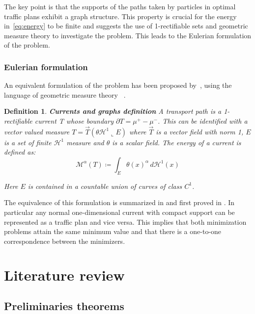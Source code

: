 \documentclass[12pt,a4paper]{article}
\numberwithin{equation}{section}
\theoremstyle{mytheorem}
\newtheorem{definition}[subsubsection]{Definition}
\theoremstyle{myremark}
\theoremstyle{myparagraph}
\begin{document}
    The key point is that the supports of the paths taken by particles in optimal traffic plans exhibit a graph structure. This property is crucial for
    the energy in~\ref{eq:energy} to be finite and suggests the use of 1-rectifiable sets and geometric measure theory to investigate the problem.
    This leads to the Eulerian formulation of the problem.


    \subsubsection{Eulerian formulation}

    An equivalent formulation of the problem has been proposed by~\cite{paolini2006optimal}, using the language of 
    geometric measure theory~\cite{simon2014introduction} \cite{federer2014geometric}.
    \begin{definition}
        \textbf{Currents and graphs definition} 
        A transport path is a 1-rectifiable current T whose boundary $\partial T = \mu^+ - \mu^-$. This can be identified with a vector valued
        measure $T = \vec{T}(\theta \mathcal{H}^1 \llcorner E)$ where $\vec{T}$ is a vector field with norm 1, $E$ is a set of finite $\mathcal{H}^1$ measure and
        $\theta$ is a scalar field.
        The energy of a current is defined as:
        \begin{equation}
            \mathcal{M}^{\alpha}(T) \coloneqq \int_{E} \theta(x)^\alpha \, d\mathcal{H}^1(x)
        \end{equation}

        Here $E$ is contained in a countable union of curves of class $C^1$.
    \end{definition}

    The equivalence of this formulation is summarized in \cite[Chapter 9]{Bernot} and first proved in \cite{paolini2006optimal}.
    In particular any normal one-dimensional current with compact support can be represented as a traffic plan and vice versa.
    This implies that both minimization problems attain the same minimum value and that there is a one-to-one correspondence between the minimizers. 

    \section{Literature review}
    \subsection{Preliminaries theorems}
\end{document}

